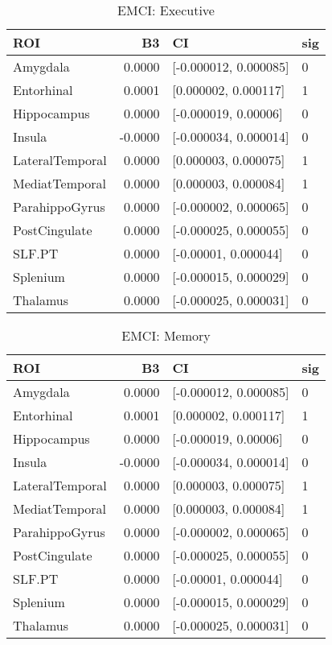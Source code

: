\documentclass{article}
\begin{document}
\begin{table}[H]
\centering
\caption{EMCI: Executive} 
\begin{tabular}{lrll}
  \toprule
ROI & B3 & CI & sig \\ 
  \midrule
Amygdala & 0.0000 & [-0.000012, 0.000085] & 0 \\ 
   \rowcolor{orange!30}Entorhinal & 0.0001 & [0.000002, 0.000117] & 1 \\ 
  Hippocampus & 0.0000 & [-0.000019, 0.00006] & 0 \\ 
  Insula & -0.0000 & [-0.000034, 0.000014] & 0 \\ 
   \rowcolor{orange!30}LateralTemporal & 0.0000 & [0.000003, 0.000075] & 1 \\ 
   \rowcolor{orange!30}MediatTemporal & 0.0000 & [0.000003, 0.000084] & 1 \\ 
  ParahippoGyrus & 0.0000 & [-0.000002, 0.000065] & 0 \\ 
  PostCingulate & 0.0000 & [-0.000025, 0.000055] & 0 \\ 
  SLF.PT & 0.0000 & [-0.00001, 0.000044] & 0 \\ 
  Splenium & 0.0000 & [-0.000015, 0.000029] & 0 \\ 
  Thalamus & 0.0000 & [-0.000025, 0.000031] & 0 \\ 
   \bottomrule
\end{tabular}
\end{table}%
\begin{table}[H]
\centering
\caption{EMCI: Memory} 
\begin{tabular}{lrll}
  \toprule
ROI & B3 & CI & sig \\ 
  \midrule
Amygdala & 0.0000 & [-0.000012, 0.000085] & 0 \\ 
   \rowcolor{orange!30}Entorhinal & 0.0001 & [0.000002, 0.000117] & 1 \\ 
  Hippocampus & 0.0000 & [-0.000019, 0.00006] & 0 \\ 
  Insula & -0.0000 & [-0.000034, 0.000014] & 0 \\ 
   \rowcolor{orange!30}LateralTemporal & 0.0000 & [0.000003, 0.000075] & 1 \\ 
   \rowcolor{orange!30}MediatTemporal & 0.0000 & [0.000003, 0.000084] & 1 \\ 
  ParahippoGyrus & 0.0000 & [-0.000002, 0.000065] & 0 \\ 
  PostCingulate & 0.0000 & [-0.000025, 0.000055] & 0 \\ 
  SLF.PT & 0.0000 & [-0.00001, 0.000044] & 0 \\ 
  Splenium & 0.0000 & [-0.000015, 0.000029] & 0 \\ 
  Thalamus & 0.0000 & [-0.000025, 0.000031] & 0 \\ 
   \bottomrule
\end{tabular}
\end{table}
\end{document}
